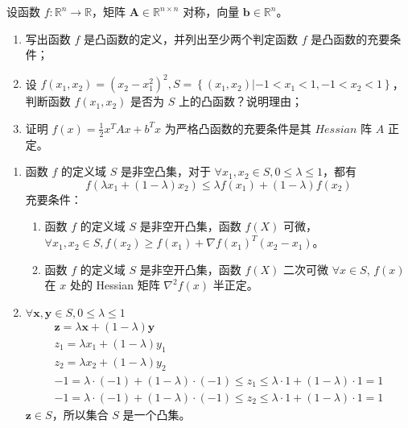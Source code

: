 \begin{problem}
    设函数 $f:\mathbb{R}^n \to \mathbb{R}$，矩阵 $\boldsymbol{A} \in \mathbb{R}^{n \times n}$ 对称，向量 $\boldsymbol{b} \in \mathbb{R}^n$。
    \begin{enumerate}
        \item 写出函数 $f$ 是凸函数的定义，并列出至少两个判定函数 $f$ 是凸函数的充要条件；
        \item 设 $f(x_1, x_2) = (x_2 - x_1^2)^2, S = \left\{(x_1, x_2)|-1 < x_1 < 1, -1 < x_2 < 1\right\}$，判断函数 $f(x_1, x_2)$ 是否为 $S$ 上的凸函数？说明理由；
        \item 证明 $f(x) = \frac{1}{2}x^TAx + b^Tx$ 为严格凸函数的充要条件是其 $Hessian$ 阵 $A$ 正定。
    \end{enumerate}
\end{problem}
\begin{solution}
    \begin{enumerate}
        \item 函数 $f$ 的定义域 $S$ 是非空凸集，对于 $\forall x_1, x_2 \in S, 0 \le \lambda \le 1$，都有 \[f(\lambda x_1 + (1 - \lambda)x_2) \le \lambda f(x_1) + (1 - \lambda)f(x_2)\] 
            充要条件：\begin{enumerate} 
                \item 函数 $f$ 的定义域 $S$ 是非空开凸集，函数 $f(X)$ 可微，$\forall x_1, x_2 \in S,f(x_2) \ge f(x_1) + \nabla f(x_1)^T(x_2 - x_1)$。
                \item 函数 $f$ 的定义域 $S$ 是非空开凸集，函数 $f(X)$ 二次可微 $\forall x \in S$, $f(x)$ 在 $x$ 处的 Hessian 矩阵 $\nabla^2f(x)$ 半正定。
            \end{enumerate}
        \item $\forall \boldsymbol{x}, \boldsymbol{y} \in S, 0\le \lambda \le 1$
            \begin{gather*}
                \boldsymbol{z} = \lambda \boldsymbol{x} + (1 - \lambda) \boldsymbol{y} \\
                z_1 = \lambda x_1 + (1 - \lambda) y_1\\
                z_2 = \lambda x_2 + (1 - \lambda) y_2\\
                -1 = \lambda \cdot (-1) + (1 - \lambda) \cdot (-1) \le z_1 \le \lambda \cdot 1 + (1 - \lambda) \cdot 1 = 1 \\
                -1 = \lambda \cdot (-1) + (1 - \lambda) \cdot (-1) \le z_2 \le \lambda \cdot 1 + (1 - \lambda) \cdot 1 = 1
            \end{gather*}
            $\boldsymbol{z} \in S$，所以集合 $S$ 是一个凸集。


\end{enumerate}
\end{solution}
